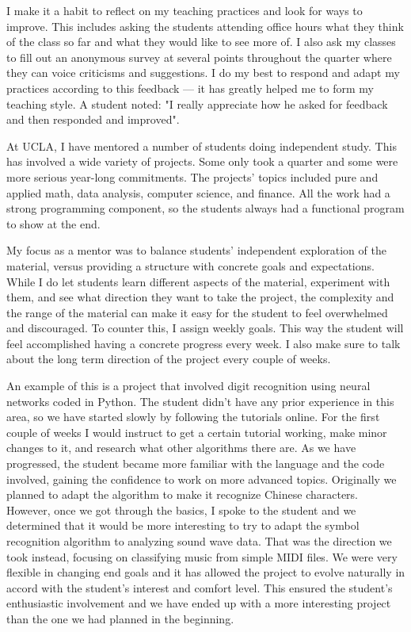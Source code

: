 \documentclass[11pt]{article}
\begin{document}
I make it a habit to reflect on my teaching practices and look for ways to improve.
This includes asking the students attending office hours what they think of the class so far and what they would like to see more of.
I also ask my classes to fill out an anonymous survey at several points throughout the quarter where they can voice criticisms and suggestions.
I do my best to respond and adapt my practices according to this feedback --- it has greatly helped me to form my teaching style.
A student noted: "I really appreciate how he asked for feedback and then responded and improved".



At UCLA, I have mentored a number of students doing independent study.
This has involved a wide variety of projects. Some only took a quarter and some were more serious year-long commitments.
The projects' topics included pure and applied math, data analysis, computer science, and finance. All the work had a strong programming component, so the students always had a functional program to show at the end.


My focus as a mentor was to balance students' independent exploration of the material, versus providing a structure with concrete goals and expectations. While I do let students learn different aspects of the material, experiment with them, and see what direction they want to take the project, the complexity and the range of the material can make it easy for the student to feel overwhelmed and discouraged. To counter this, I assign weekly goals. This way the student will feel accomplished having a concrete progress every week.  I also make sure to talk about the long term direction of the project every couple of weeks.


An example of this is a project that involved digit recognition using neural networks coded in Python. The student didn't have any prior experience in this area, so we have started slowly by following the tutorials online. For the first couple of weeks I would instruct to get a certain tutorial working, make minor changes to it, and research what other algorithms there are.
As we have progressed, the student became more familiar with the language and the code involved, gaining the confidence to work on more advanced topics. Originally we planned to adapt the algorithm to make it recognize Chinese characters. However, once we got through the basics, I spoke to the student and we determined that it would be more interesting to try to adapt the symbol recognition algorithm to analyzing sound wave data. That was the direction we took instead, focusing on classifying music from simple MIDI files. We were very flexible in changing end goals and it has allowed the project to evolve naturally in accord with the student's interest and comfort level.
This ensured the student's enthusiastic involvement and we have ended up with a more interesting project than the one we had planned in the beginning.
\end{document}

